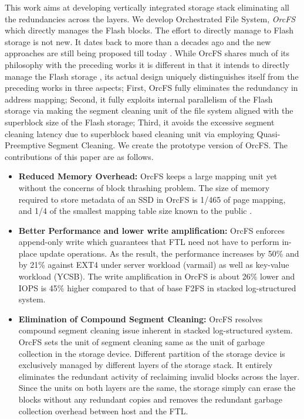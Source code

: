 \documentclass[pageno]{jpaper}
\begin{document}
This work aims at developing vertically integrated storage stack
eliminating all the redundancies across the layers. We develop
Orchestrated File System, \emph{OrcFS} which directly manages the Flash
blocks. The effort to directly manage to Flash storage is not new. It
dates back to more than a decades ago \cite{woodhouse2001jffs,
  manning2010yaffs} and the new approaches are still being proposed
till today \cite{nvmkv, sdf, anvil, zhangremoving, lee2016application,
  zhang2016parafs}.  While OrcFS shares much of its philosophy with
the preceding works it is different in that it intends to directly manage the Flash
storage \cite{lee2016application, zhang2016parafs}, its actual design
uniquely distinguishes itself from the preceding works in three
aspects; First, OrcFS fully eliminates the redundancy in address
mapping; Second, it fully exploits internal parallelism of the Flash
storage via making the segment cleaning unit of the file system aligned
with the superblock size of the Flash storage; Third, it avoids the
excessive segment cleaning latency due to superblock based cleaning
unit via employing Quasi-Preemptive Segment Cleaning.  We create the prototype
version of OrcFS.  The contributions of this paper are as follows.

\begin{itemize} 
\item {\bf Reduced Memory Overhead:} OrcFS keeps a large mapping unit
  yet without the concerns of block thrashing problem. The size of
  memory required to store metadata of an SSD in OrcFS is 1/465 of page
  mapping, and 1/4 of the smallest mapping table size known to the
  public \cite{lee2016application}.

\item {\bf Better Performance and lower write amplification:} OrcFS
enforces append-only write which 
  guarantees that FTL need not have to perform in-place update operations. As the result, the
  performance increases by 50\% and by 21\% against EXT4 under server
  workload (varmail) as well as key-value workload (YCSB).  The write
  amplification in OrcFS is about 26$\%$ lower and IOPS is 45$\%$
  higher compared to that of base F2FS in stacked log-structured
  system.

\item {\bf Elimination of Compound Segment Cleaning:} OrcFS resolves
  compound segment cleaning issue inherent in stacked log-structured
  system. OrcFS sets the unit of segment cleaning same as the unit of
  garbage collection in the storage device. Different partition of the
  storage device is exclusively managed by different layers of the
  storage stack. It entirely eliminates the redundant activity of
  reclaiming invalid blocks across the layer. Since the units on both
  layers are the same, the storage simply can erase the blocks without
  any redundant copies and removes the redundant garbage collection
  overhead between host and the FTL.
\end{itemize}
\end{document}
